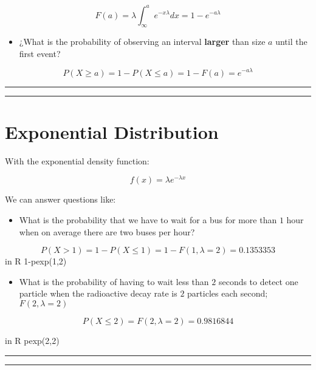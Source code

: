 \documentclass[
]{book}
\providecommand{\tightlist}{%
  \setlength{\itemsep}{0pt}\setlength{\parskip}{0pt}}
\begin{document}
\[F(a)=\lambda \int_\infty^a e^{-x\lambda}dx=1-e^{-a\lambda}\]

\begin{itemize}
\tightlist
\item
  ¿What is the probability of observing an interval \textbf{larger} than size \(a\) until the first event?
\end{itemize}

\[P(X \geq a)=1- P(X \leq a)= 1- F(a) = e^{-a\lambda}\]

\begin{center}\rule{0.5\linewidth}{0.5pt}\end{center}

\begin{center}\rule{0.5\linewidth}{0.5pt}\end{center}

\hypertarget{exponential-distribution-1}{%
\section{Exponential Distribution}\label{exponential-distribution-1}}

With the exponential density function:

\[f(x)=\lambda e^{-\lambda x}\]

We can answer questions like:

\begin{itemize}
\tightlist
\item
  What is the probability that we have to wait for a bus for more than \(1\) hour when on average there are two buses per hour?
\end{itemize}

\[P(X > 1)=1-P(X \le 1) = 1-F(1,\lambda=2)=0.1353353\]
in R 1-pexp(1,2)

\begin{itemize}
\tightlist
\item
  What is the probability of having to wait less than \(2\) seconds to detect one particle when the radioactive decay rate is \(2\) particles each second; \(F(2,\lambda=2)\)
\end{itemize}

\[P(X \le 2)=F(2,\lambda=2)=0.9816844\]

in R pexp(2,2)

\begin{center}\rule{0.5\linewidth}{0.5pt}\end{center}

\begin{center}\rule{0.5\linewidth}{0.5pt}\end{center}
\end{document}
